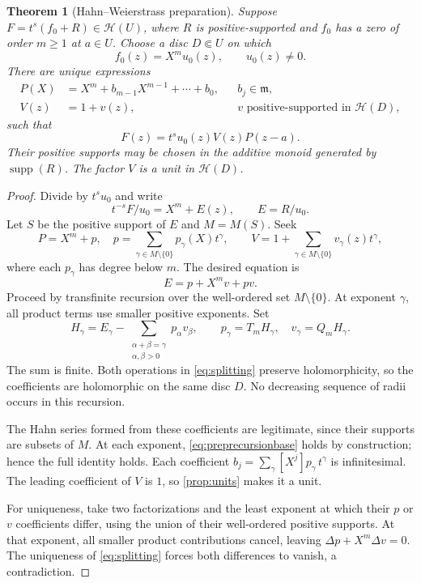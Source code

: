 \documentclass[11pt,letterpaper]{article}
\numberwithin{equation}{section}
\newtheorem{theorem}{Theorem}[section]
\theoremstyle{definition}
\theoremstyle{remark}
\newcommand{\mm}{\mathfrak{m}}
\newcommand{\HH}{\mathcal{H}}
\newcommand{\supp}{\operatorname{supp}}
\begin{document}
\begin{theorem}[Hahn--Weierstrass preparation]\label{thm:preparation}
Suppose $F=t^s(f_0+R)\in\HH(U)$, where $R$ is positive-supported and $f_0$
has a zero of order $m\ge1$ at $a\in U$. Choose a disc $D\Subset U$ on which
\[
 f_0(z)=X^m u_0(z),\qquad u_0(z)\ne0.
\]
There are unique expressions
\begin{align}
 P(X)&=X^m+b_{m-1}X^{m-1}+\cdots+b_0,
       &&b_j\in\mm,\label{eq:prepP}\\
 V(z)&=1+v(z),&&v\text{ positive-supported in }\HH(D),
\end{align}
such that
\begin{equation}\label{eq:prep}
 F(z)=t^s u_0(z)V(z)P(z-a).
\end{equation}
Their positive supports may be chosen in the additive monoid generated by
$\supp(R)$. The factor $V$ is a unit in $\HH(D)$.
\end{theorem}
\begin{proof}
Divide by $t^s u_0$ and write
\[
 t^{-s}F/u_0=X^m+E(z),\qquad E=R/u_0.
\]
Let $S$ be the positive support of $E$ and $M=M(S)$. Seek
\[
 P=X^m+p,\quad p=\sum_{\gamma\in M\setminus\{0\}}p_\gamma(X)t^\gamma,
 \qquad V=1+\sum_{\gamma\in M\setminus\{0\}}v_\gamma(z)t^\gamma,
\]
where each $p_\gamma$ has degree below $m$. The desired equation is
\begin{equation}\label{eq:preprecursionbase}
 E=p+X^m v+pv.
\end{equation}
Proceed by transfinite recursion over the well-ordered set
$M\setminus\{0\}$. At exponent $\gamma$, all product terms use smaller
positive exponents. Set
\begin{equation}\label{eq:preprecursion}
 H_\gamma=E_\gamma-
 \sum_{\substack{\alpha+\beta=\gamma\\\alpha,\beta>0}}
 p_\alpha v_\beta,
 \qquad p_\gamma=T_mH_\gamma,\quad v_\gamma=Q_mH_\gamma.
\end{equation}
The sum is finite. Both operations in \eqref{eq:splitting} preserve
holomorphicity, so the coefficients are holomorphic on the same disc $D$.
No decreasing sequence of radii occurs in this recursion.

The Hahn series formed from these coefficients are legitimate, since their
supports are subsets of $M$. At each exponent, \eqref{eq:preprecursionbase}
holds by construction; hence the full identity holds. Each coefficient
$b_j=\sum_\gamma [X^j]p_\gamma\,t^\gamma$ is infinitesimal. The leading
coefficient of $V$ is $1$, so \cref{prop:units} makes it a unit.

For uniqueness, take two factorizations and the least exponent at which their
$p$ or $v$ coefficients differ, using the union of their well-ordered
positive supports. At that exponent, all smaller product contributions
cancel, leaving $\Delta p+X^m\Delta v=0$. The uniqueness of
\eqref{eq:splitting} forces both differences to vanish, a contradiction.
\end{proof}
\end{document}
